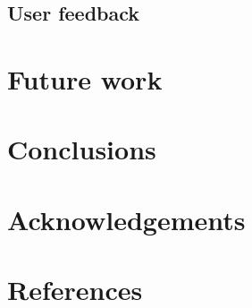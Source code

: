 \documentclass[a4paper,11pt,twocolumn]{article}
\begin{document}
\subsection{User feedback}

\section{Future work}

\section{Conclusions}

\section*{Acknowledgements}

\section{References}
\end{document}
